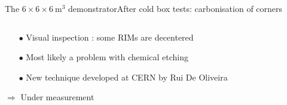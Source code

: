 \documentclass[10pt]{beamer}
\begin{document}
\begin{frame}{The \texorpdfstring{$6 \times 6 \times \SI{6}{\meter\cubed}$}{666} demonstrator}{After cold box tests: carbonisation of corners}
\begin{scriptsize}
\begin{columns}
\begin{column}{0.6\textwidth}
	       				\vfill
	       				\begin{itemize}
	       					\item[$\bullet$] Visual inspection : some RIMs are decentered
	       					\item[$\bullet$] Most likely a problem with chemical etching
	       					\item[$\bullet$] New technique developed at CERN by Rui De Oliveira
	       				\end{itemize}
	       				$\Rightarrow$ Under measurement
	       			\end{column}
	       		\end{columns}
	       	\end{scriptsize}
       \end{frame}
       {
       \begin{frame}[plain]
       	
       \end{frame}
	    }
	    
\end{document}
